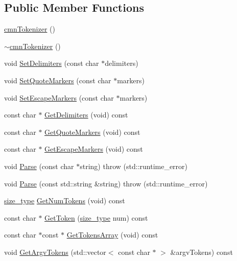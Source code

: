 \subsection*{Public Member Functions}
\begin{DoxyCompactItemize}
\item 
\hyperlink{classcmn_tokenizer_ad18f864eb2837d7d6c4f8f595bb28e12}{cmn\-Tokenizer} ()
\item 
\hyperlink{classcmn_tokenizer_a3590cb8c8426fdd6ff137bf80de4866c}{$\sim$cmn\-Tokenizer} ()
\item 
void \hyperlink{classcmn_tokenizer_aa5a30cc94732f312ed82370e218be236}{Set\-Delimiters} (const char $\ast$delimiters)
\item 
void \hyperlink{classcmn_tokenizer_accde43d610ec450536f310e6f832eb3c}{Set\-Quote\-Markers} (const char $\ast$markers)
\item 
void \hyperlink{classcmn_tokenizer_a7bb0f1c5767837a9021898139956bee5}{Set\-Escape\-Markers} (const char $\ast$markers)
\item 
const char $\ast$ \hyperlink{classcmn_tokenizer_a18d44606191cfdd4b9aba9683e5810a4}{Get\-Delimiters} (void) const 
\item 
const char $\ast$ \hyperlink{classcmn_tokenizer_ab9ddd7ecb5f418b4cc11c049f7369581}{Get\-Quote\-Markers} (void) const 
\item 
const char $\ast$ \hyperlink{classcmn_tokenizer_a3656f9c6bdd738742111edfdc960360e}{Get\-Escape\-Markers} (void) const 
\item 
void \hyperlink{classcmn_tokenizer_a1c90fd9b013360f7de462e8bf546a663}{Parse} (const char $\ast$string)  throw (std\-::runtime\-\_\-error)
\item 
void \hyperlink{classcmn_tokenizer_a73139aca8f34b41e94822b7a86095714}{Parse} (const std\-::string \&string)  throw (std\-::runtime\-\_\-error)
\item 
\hyperlink{classcmn_tokenizer_aa1b3819de936a3639e8ef5841f7fe762}{size\-\_\-type} \hyperlink{classcmn_tokenizer_a3a374f093c9e476458394a148c4f82da}{Get\-Num\-Tokens} (void) const 
\item 
const char $\ast$ \hyperlink{classcmn_tokenizer_aed48e923ab4b6b98fd284838cb5d0d49}{Get\-Token} (\hyperlink{classcmn_tokenizer_aa1b3819de936a3639e8ef5841f7fe762}{size\-\_\-type} num) const 
\item 
const char $\ast$const $\ast$ \hyperlink{classcmn_tokenizer_ae09e7f92f12ce54fa4116ba95f4af942}{Get\-Tokens\-Array} (void) const 
\item 
void \hyperlink{classcmn_tokenizer_a2fe39c6751f33cf1b81c9461d47b1462}{Get\-Argv\-Tokens} (std\-::vector$<$ const char $\ast$ $>$ \&argv\-Tokens) const 
\end{DoxyCompactItemize}
